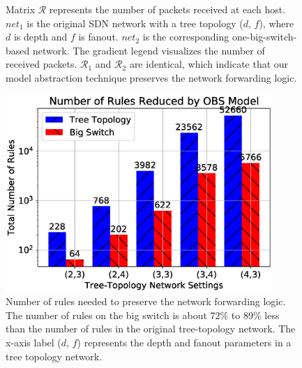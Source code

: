 \begin{figure}[ht]
{                \label{OBS:Fig:PingMatrix3}
        }
        \caption[Forwarding Logic Evaluation after One-Big-Switch Abstraction]{
        Matrix $\mathcal{R}$ represents the number of packets received at each host.
        $net_1$ is the original SDN network with a tree topology ($d$, $f$),
        where $d$ is depth and $f$ is fanout.
        $net_2$ is the corresponding one-big-switch-based network.
        The gradient legend visualizes the number of received packets.
        $\mathcal{R}_1$ and $\mathcal{R}_2$ are identical,
        which indicate that our model abstraction technique preserves the network forwarding logic.}
        \label{OBS:Fig:ComparePingMatrix}
\end{figure}

\begin{figure}[ht]
\centering
\includegraphics[width=0.9\textwidth]{OneBigSwitch/figures/comp_num_rules.eps}
\caption[Number of Rules Reduced after One-Big-Switch Abstraction]{Number of rules needed to preserve the network forwarding logic.
        The number of rules on the big switch is about 72\% to 89\% less than
        the number of rules in the original tree-topology network.
        The x-axis label ($d$, $f$) represents the depth and fanout parameters
        in a tree topology network.}
\label{OBS:Fig:CompareNumRules}
\end{figure}


